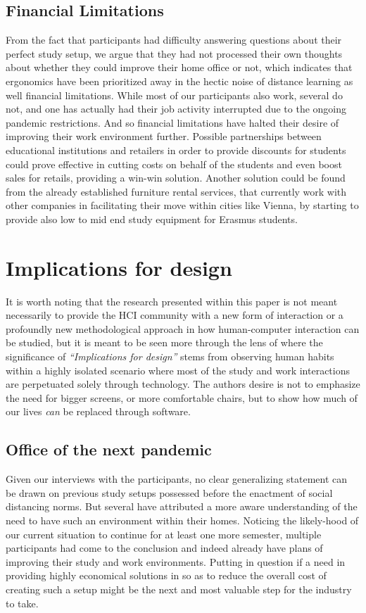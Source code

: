 \documentclass{sigchi}
\begin{document}
\subsection{Financial Limitations}
From the fact that participants had difficulty answering questions about their perfect study setup, we argue that they had not processed their own thoughts about whether they could improve their home office or not, which indicates that ergonomics have been prioritized away in the hectic noise of distance learning as well financial limitations. While most of our participants also work, several do not, and one has actually had their job activity interrupted due to the ongoing pandemic restrictions. And so financial limitations have halted their desire of improving their work environment further. Possible partnerships between educational institutions and retailers in order to provide discounts for students could prove effective in cutting costs on behalf of the students and even boost sales for retails, providing a win-win solution. Another solution could be found from the already established furniture rental services, that currently work with other companies in facilitating their move within cities like Vienna, by starting to provide also low to mid end study equipment for Erasmus students.


\section{Implications for design}

It is worth noting that the research presented within this paper is not meant necessarily to provide the HCI community with a new form of interaction or a profoundly new methodological approach in how human-computer interaction can be studied, but it is meant to be seen more through the lens of \cite{dourish_implications_2006} where the significance of \emph{``Implications for design''} stems from observing human habits within a highly isolated scenario where most of the study and work interactions are perpetuated solely through technology. The authors desire is not to emphasize the need for bigger screens, or more comfortable chairs, but to show how much of our lives \emph{can} be replaced through software.

\subsection{Office of the next pandemic}

Given our interviews with the participants, no clear generalizing statement can be drawn on previous study setups possessed before the enactment of social distancing norms. But several have attributed a more aware understanding of the need to have such an environment within their homes. 
Noticing the likely-hood of our current situation to continue for at least one more semester, multiple participants had come to the conclusion and indeed already have plans of improving their study and work environments. Putting in question if a need in providing highly economical solutions in so as to reduce the overall cost of creating such a setup might be the next and most valuable step for the industry to take.
\end{document}
